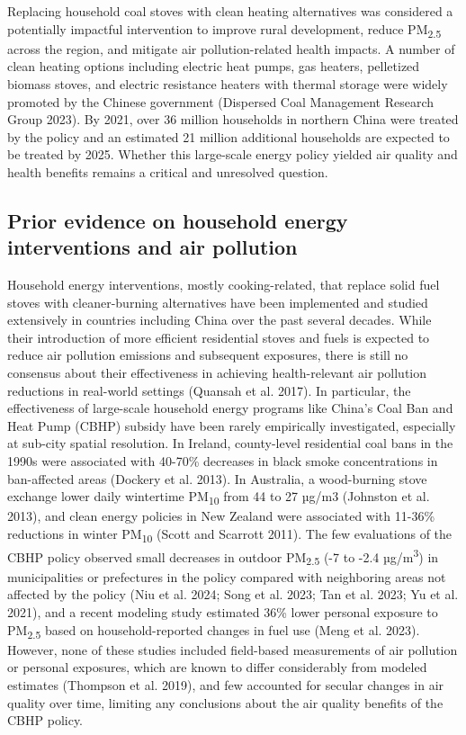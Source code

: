 \documentclass[
  letterpaper,
  DIV=11,
  numbers=noendperiod]{scrartcl}
\begin{document}
Replacing household coal stoves with clean heating alternatives was
considered a potentially impactful intervention to improve rural
development, reduce PM\textsubscript{2.5} across the region, and
mitigate air pollution-related health impacts. A number of clean heating
options including electric heat pumps, gas heaters, pelletized biomass
stoves, and electric resistance heaters with thermal storage were widely
promoted by the Chinese government (Dispersed Coal Management Research
Group 2023). By 2021, over 36 million households in northern China were
treated by the policy and an estimated 21 million additional households
are expected to be treated by 2025. Whether this large-scale energy
policy yielded air quality and health benefits remains a critical and
unresolved question.

\hypertarget{prior-evidence-on-household-energy-interventions-and-air-pollution}{%
\subsection{Prior evidence on household energy interventions and air
pollution}\label{prior-evidence-on-household-energy-interventions-and-air-pollution}}

Household energy interventions, mostly cooking-related, that replace
solid fuel stoves with cleaner-burning alternatives have been
implemented and studied extensively in countries including China over
the past several decades. While their introduction of more efficient
residential stoves and fuels is expected to reduce air pollution
emissions and subsequent exposures, there is still no consensus about
their effectiveness in achieving health-relevant air pollution
reductions in real-world settings (Quansah et al. 2017). In particular,
the effectiveness of large-scale household energy programs like China's
Coal Ban and Heat Pump (CBHP) subsidy have been rarely empirically
investigated, especially at sub-city spatial resolution. In Ireland,
county-level residential coal bans in the 1990s were associated with
40-70\% decreases in black smoke concentrations in ban-affected areas
(Dockery et al. 2013). In Australia, a wood-burning stove exchange lower
daily wintertime PM\textsubscript{10} from 44 to 27 µg/m3 (Johnston et
al. 2013), and clean energy policies in New Zealand were associated with
11-36\% reductions in winter PM\textsubscript{10} (Scott and Scarrott
2011). The few evaluations of the CBHP policy observed small decreases
in outdoor PM\textsubscript{2.5} (-7 to -2.4 µg/m\textsuperscript{3}) in
municipalities or prefectures in the policy compared with neighboring
areas not affected by the policy (Niu et al. 2024; Song et al. 2023; Tan
et al. 2023; Yu et al. 2021), and a recent modeling study estimated 36\%
lower personal exposure to PM\textsubscript{2.5} based on
household-reported changes in fuel use (Meng et al. 2023). However, none
of these studies included field-based measurements of air pollution or
personal exposures, which are known to differ considerably from modeled
estimates (Thompson et al. 2019), and few accounted for secular changes
in air quality over time, limiting any conclusions about the air quality
benefits of the CBHP policy.
\end{document}
